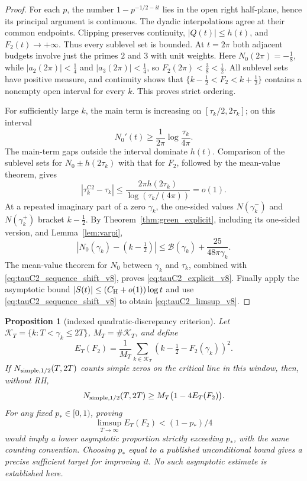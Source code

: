 \documentclass[11pt,reqno]{amsart}
\numberwithin{equation}{section}
\newtheorem{proposition}[theorem]{Proposition}
\theoremstyle{definition}
\theoremstyle{remark}
\begin{document}
\begin{proof}
For each $p$, the number $1-p^{-1/2-it}$ lies in the open
right half-plane, hence its principal argument is continuous.
The dyadic interpolations agree at their common endpoints.
Clipping preserves continuity, $|Q(t)|\le h(t)$, and
$F_2(t)\to+\infty$. Thus every sublevel set is bounded.
At $t=2\pi$ both adjacent budgets involve just the primes
$2$ and $3$ with unit weights.
Here $N_0(2\pi)=-\frac18$, while
$|a_2(2\pi)|<\frac14$ and $|a_3(2\pi)|<\frac14$,
so $F_2(2\pi)<\frac38<\frac12$.
All sublevel sets have positive measure, and continuity shows
that $\{k-\frac12<F_2<k+\frac12\}$ contains a nonempty
open interval for every $k$. This proves strict ordering.

For sufficiently large $k$, the main term is increasing on
$[\tau_k/2,2\tau_k]$; on this interval
\[
 N_0'(t)\ge\frac1{2\pi}\log\frac{\tau_k}{4\pi}.
\]
The main-term gaps outside the interval dominate $h(t)$.
Comparison of the sublevel sets for $N_0\pm h(2\tau_k)$
with that for $F_2$, followed by the mean-value theorem, gives
\begin{equation}
 |\tau_k^{\mathrm{C2}}-\tau_k|
 \le\frac{2\pi h(2\tau_k)}{\log(\tau_k/(4\pi))}
 =o(1).
 \label{eq:tauC2_sequence_shift_v8}
\end{equation}
At a repeated imaginary part of a zero $\gamma_k$, the one-sided values
$N(\gamma_k^-)$ and $N(\gamma_k^+)$ bracket $k-\frac12$.
By Theorem~\ref{thm:green_explicit}, including its one-sided
version, and Lemma~\ref{lem:varpi},
\[
 |N_0(\gamma_k)-(k-\tfrac12)|
 \le\mathcal B(\gamma_k)
        +\frac{25}{48\pi\gamma_k}.
\]
The mean-value theorem for $N_0$ between $\gamma_k$ and
$\tau_k$, combined with \eqref{eq:tauC2_sequence_shift_v8},
proves \eqref{eq:tauC2_explicit_v8}. Finally apply the
asymptotic bound $|S(t)|\le(C_{\rm H}+o(1))\log t$
and use \eqref{eq:tauC2_sequence_shift_v8} to obtain
\eqref{eq:tauC2_limsup_v8}.
\end{proof}

\begin{proposition}[indexed quadratic-discrepancy criterion]
\label{prop:tauC2_quadratic_sum_v8}
Let $\mathcal K_T=\{k:T<\gamma_k\le2T\}$,
$M_T=\#\mathcal K_T$, and define
\[
 E_T(F_2)=\frac1{M_T}\sum_{k\in\mathcal K_T}
 \left(k-\tfrac12-F_2(\gamma_k)\right)^2.
\]
If $N_{\rm simple,1/2}(T,2T)$ counts simple zeros
on the critical line in this window, then, without RH,
\begin{equation}
 N_{\rm simple,1/2}(T,2T)
 \ge M_T\bigl(1-4E_T(F_2)\bigr).
 \label{eq:tauC2_count_v8}
\end{equation}
For any fixed $p_*\in[0,1)$, proving
\[
\limsup_{T\to\infty}E_T(F_2)<(1-p_*)/4
\]
would imply a lower asymptotic proportion
strictly exceeding $p_*$, with the same
counting convention. Choosing $p_*$ equal
to a published unconditional bound gives a
precise sufficient target for improving it.
No such asymptotic estimate is established here.

\end{proposition}
\end{document}
